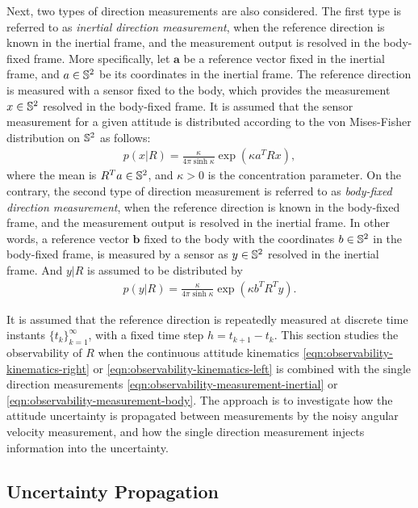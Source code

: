 Next, two types of direction measurements are also considered.
The first type is referred to as \textit{inertial direction measurement}, when the reference direction is known in the inertial frame, and the measurement output is resolved in the body-fixed frame.
More specifically, let $\bm{a}$ be a reference vector fixed in the inertial frame, and $a\in\mathbb{S}^2$ be its coordinates in the inertial frame.
The reference direction is measured with a sensor fixed to the body, which provides the measurement $x\in\mathbb{S}^2$ resolved in the body-fixed frame. 
It is assumed that the sensor measurement for a given attitude is distributed according to the von Mises-Fisher distribution on $\mathbb{S}^2$ as follows:
\begin{align} \label{eqn:observability-measurement-inertial}
	p(x|R) = \frac{\kappa}{4\pi\sinh \kappa} \exp( \kappa a^T Rx),
\end{align}
where the mean is $R^Ta\in\mathbb{S}^2$, and $\kappa>0$ is the concentration parameter.
On the contrary, the second type of direction measurement is referred to as \textit{body-fixed direction measurement}, when the reference direction is known in the body-fixed frame, and the measurement output is resolved in the inertial frame.
In other words, a reference vector $\bm{b}$ fixed to the body with the coordinates $b\in\mathbb{S}^2$ in the body-fixed frame, is measured by a sensor as $y\in\mathbb{S}^2$ resolved in the inertial frame.
And $y|R$ is assumed to be distributed by
\begin{align} \label{eqn:observability-measurement-body}
	p(y|R) = \frac{\kappa}{4\pi\sinh \kappa} \exp( \kappa b^T R^T y).
\end{align}

It is assumed that the reference direction is repeatedly measured at discrete time instants $\{t_k\}_{k=1}^\infty$, with a fixed time step $h = t_{k+1}-t_k$.
This section studies the observability of $R$ when the continuous attitude kinematics \eqref{eqn:observability-kinematics-right} or \eqref{eqn:observability-kinematics-left} is combined with the single direction measurements \eqref{eqn:observability-measurement-inertial} or \eqref{eqn:observability-measurement-body}.
The approach is to investigate how the attitude uncertainty is propagated between measurements by the noisy angular velocity measurement, and how the single direction measurement injects information into the uncertainty.

\subsection{Uncertainty Propagation} \label{section:observability-propagation}

